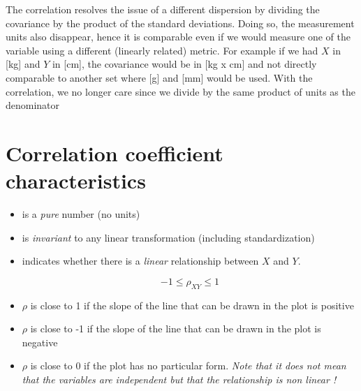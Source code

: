 \documentclass[
  letterpaper,
  DIV=11,
  numbers=noendperiod]{scrreprt}
\begin{document}
The correlation resolves the issue of a different dispersion by dividing
the covariance by the product of the standard deviations. Doing so, the
measurement units also disappear, hence it is comparable even if we
would measure one of the variable using a different (linearly related)
metric. For example if we had \(X\) in {[}kg{]} and \(Y\) in {[}cm{]},
the covariance would be in {[}kg x cm{]} and not directly comparable to
another set where {[}g{]} and {[}mm{]} would be used. With the
correlation, we no longer care since we divide by the same product of
units as the denominator

\section{Correlation coefficient
characteristics}\label{correlation-coefficient-characteristics}

\begin{itemize}
\item
  is a \emph{pure} number (no units)
\item
  is \emph{invariant} to any linear transformation (including
  standardization)
\item
  indicates whether there is a \emph{linear} relationship between \(X\)
  and \(Y\).

  \[−1≤ \rho_{XY} ≤1\]
\item
  \(\rho\) is close to 1 if the slope of the line that can be drawn in
  the plot is positive
\item
  \(\rho\) is close to -1 if the slope of the line that can be drawn in
  the plot is negative
\item
  \(\rho\) is close to 0 if the plot has no particular form. \emph{Note
  that it does not mean that the variables are independent but that the
  relationship is non linear !}
\end{itemize}
\end{document}
